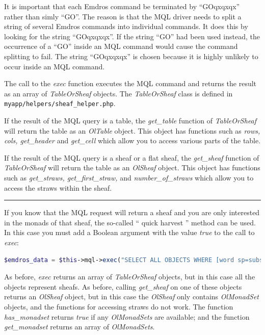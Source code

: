 \documentclass[11pt,oneside,a4paper]{memoir}
\newcommand*{\indexw}[1]{%
  #1%
  \index{#1}%
}
\begin{document}
It is important that each Emdros command be terminated by ``GOqxqxqx'' rather than simly ``GO''. The
reason is that the MQL driver needs to split a string of several Emdros commands into individual
commands. It does this by looking for the string ``GOqxqxqx''. If the string ``GO'' had been used
instead, the occurrence of a ``GO'' inside an MQL command would cause the command splitting to fail.
The string ``GOqxqxqx'' is chosen because it is highly unlikely to occur inside an MQL command.

The call to the \emph{exec} function executes the MQL command and returns the result as an array of
\emph{TableOrSheaf} objects. The \emph{TableOrSheaf} class is defined in
\texttt{myapp/helpers/sheaf\_helper.php}.

If the result of the MQL query is a table, the \emph{get\_table} function of \emph{TableOrSheaf}
will return the table as an \emph{OlTable} object.  This object has functions
such as \emph{rows, cols, get\_header} and \emph{get\_cell} which allow you to
access various parts of the table.

If the result of the MQL query is a sheaf or a flat sheaf, the \emph{get\_sheaf} function of
\emph{TableOrSheaf} will return the table as an \emph{OlSheaf} object. This object has functions
such as \emph{get\_straws, get\_first\_straw,} and \emph{number\_of\_straws} which allow you to
access the straws within the sheaf.

\pfbreak

If you know that the MQL request will return a sheaf and you are only interested in the monads of
that sheaf, the so-called ``\indexw{quick harvest}'' method can be used. In
this case you must add a Boolean argument with the value \emph{true} to the call to \emph{exec}:

\begin{lstlisting}[language=PHP]
$emdros_data = $this->mql->exec("SELECT ALL OBJECTS WHERE [word sp=subs] GOqxqxqx", true);
\end{lstlisting}

As before, \emph{exec} returns an array of \emph{TableOrSheaf} objects, but in this case all the
objects represent sheafs. As before, calling \emph{get\_sheaf} on one of these objects returns an
\emph{OlSheaf} object, but in this case the \emph{OlSheaf} only contains \emph{OlMonadSet} objects, and the
functions for accessing straws do not work. The function \emph{has\_monadset} returns \emph{true} if
any \emph{OlMonadSets} are available; and the function \emph{get\_monadset} returns an array of
\emph{OlMonadSets}.
\end{document}
